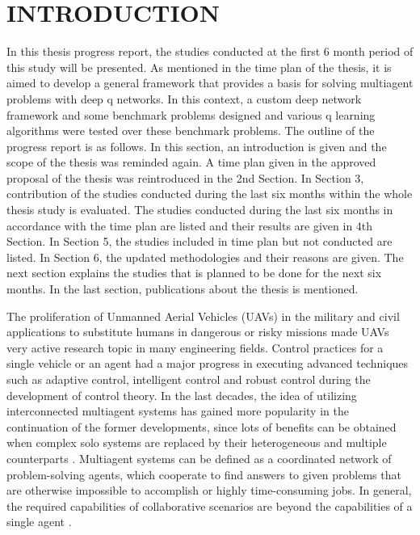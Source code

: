 \documentclass{ituphdreport}
\begin{document}
\section{INTRODUCTION}

In this thesis progress report, the studies conducted at the first 6 month period of this study will be presented. As mentioned in the time plan of the thesis, it is aimed to develop a general framework that provides a basis for solving multiagent problems with deep q networks. In this context, a custom deep network framework and some benchmark problems designed and various q learning algorithms were tested over these benchmark problems. The outline of the progress report is as follows. In this section, an introduction is given and the scope of the thesis was reminded again. A time plan given in the approved proposal of the thesis was reintroduced in the 2nd Section. In Section 3, contribution of the studies conducted during the last six months within the whole thesis study is evaluated. The studies conducted during the last six months in accordance with the time plan are listed and their results are given in 4th Section. In Section 5, the studies included in time plan but not conducted are listed. In Section 6, the updated methodologies and their reasons are given. The next section explains the studies that is planned to be done for the next six months. In the last section, publications about the thesis is mentioned.

The proliferation of Unmanned Aerial Vehicles (UAVs) in the military and civil applications to substitute humans in dangerous or risky missions made UAVs very active research topic in many engineering fields. Control practices for a single vehicle or an agent had a major progress in executing advanced techniques such as adaptive control, intelligent control and robust control during the development of control theory. In the last decades, the idea of utilizing interconnected multiagent systems has gained more popularity in the continuation of the former developments, since lots of benefits can be obtained when complex solo systems are replaced by their heterogeneous and multiple counterparts \cite{rencao11}. Multiagent systems can be defined as a coordinated network of problem-solving agents, which cooperate to find answers to given problems that are otherwise impossible to accomplish or highly time-consuming jobs. In general, the required capabilities of collaborative scenarios are beyond the capabilities of a single agent \cite{glavic06}.
\end{document}
